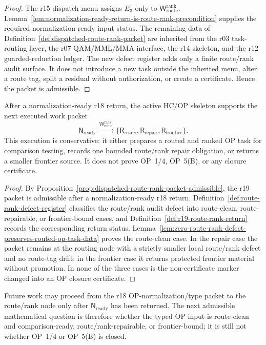 \begin{proof}
The r15 dispatch menu assigns \(E_3\) only to \(\mathsf W_{\mathrm{route}}^{\mathrm{rank}}\).  Lemma~\ref{lem:normalization-ready-return-is-route-rank-precondition} supplies the required normalization-ready input status.  The remaining data of Definition~\ref{def:dispatched-route-rank-packet} are inherited from the r03 task-routing layer, the r07 QAM/MML/MMA interface, the r14 skeleton, and the r12 guarded-reduction ledger.  The new defect register adds only a finite route/rank audit surface.  It does not introduce a new task outside the inherited menu, alter a route tag, split a residual without authorization, or create a certificate.  Hence the packet is admissible.
\end{proof}

\begin{theorem}
\label{thm:first-dispatched-route-rank-packet}
After a normalization-ready r18 return, the active HC/OP skeleton supports the next executed work packet
\[
  \mathsf N_{\mathrm{ready}}
  \xrightarrow{\;\mathsf W_{\mathrm{route}}^{\mathrm{rank}}\;}
  \{\mathsf R_{\mathrm{ready}},\mathsf R_{\mathrm{repair}},\mathsf R_{\mathrm{frontier}}\}.
\]
This execution is conservative: it either prepares a routed and ranked OP task for comparison testing, records one bounded route/rank repair obligation, or returns a smaller frontier source.  It does not prove OP~1/4, OP~5(B), or any closure certificate.
\end{theorem}

\begin{proof}
By Proposition~\ref{prop:dispatched-route-rank-packet-admissible}, the r19 packet is admissible after a normalization-ready r18 return.  Definition~\ref{def:route-rank-defect-register} classifies the route/rank audit defect into route-clean, route-repairable, or frontier-bound cases, and Definition~\ref{def:r19-route-rank-return} records the corresponding return status.  Lemma~\ref{lem:zero-route-rank-defect-preserves-routed-op-task-data} proves the route-clean case.  In the repair case the packet remains at the routing node with a strictly smaller local route/rank defect and no route-tag drift; in the frontier case it returns protected frontier material without promotion.  In none of the three cases is the non-certificate marker changed into an OP closure certificate.
\end{proof}

\begin{corollary}
\label{cor:v3340-r19-working-rule}
Future work may proceed from the r18 OP-normalization/type packet to the route/rank node only after \(\mathsf N_{\mathrm{ready}}\) has been returned.  The next admissible mathematical question is therefore whether the typed OP input is route-clean and comparison-ready, route/rank-repairable, or frontier-bound; it is still not whether OP~1/4 or OP~5(B) is closed.
\end{corollary}

